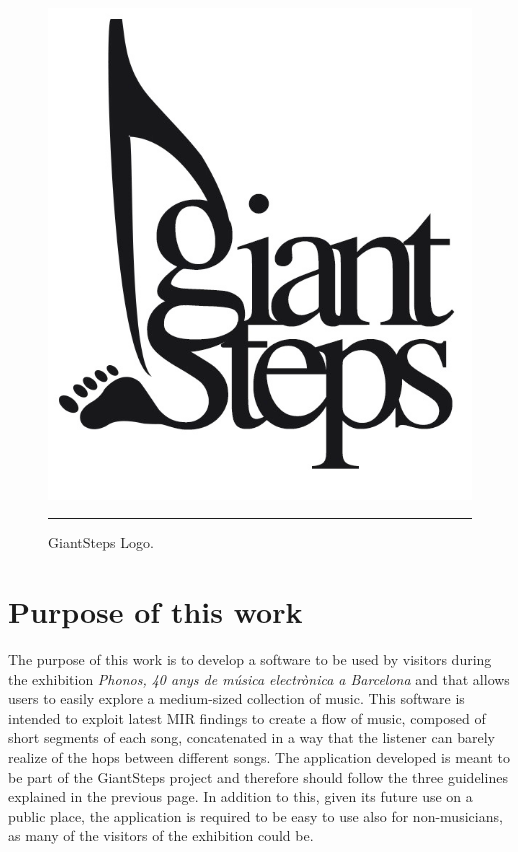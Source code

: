 \begin{figure}[htbp]
  \centering
    \includegraphics{Figures/giantsteps.png}
    \rule{35em}{0.5pt}
  \caption[GiantSteps]{GiantSteps Logo.}
  \label{fig:GiantSteps}
\end{figure}


\section{Purpose of this work}
The purpose of this work is to develop a software to be used by visitors during the exhibition \textit{Phonos, 40 anys de música electrònica a Barcelona} and that allows users to easily explore a medium-sized collection of music. This software is intended to exploit latest MIR findings to create a flow of music, composed of short segments of each song, concatenated in a way that the listener can barely realize of the hops between different songs. The application developed is meant to be part of the GiantSteps project and therefore should follow the three guidelines explained in the previous page. In addition to this, given its future use on a public place, the application is required to be easy to use also for non-musicians, as many of the visitors of the exhibition could be.

